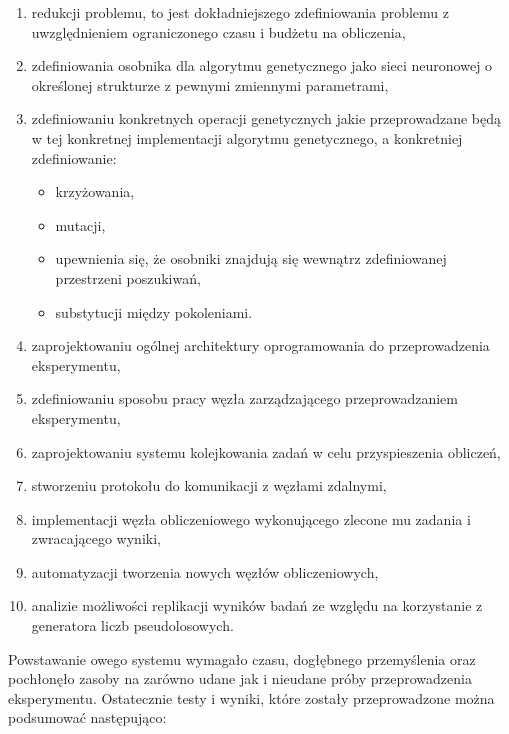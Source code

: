 \begin{enumerate}
  \item redukcji problemu, to jest dokładniejszego zdefiniowania problemu z uwzględnieniem ograniczonego czasu i budżetu na obliczenia,
  \item zdefiniowania osobnika dla algorytmu genetycznego jako sieci neuronowej o określonej strukturze z pewnymi zmiennymi parametrami,
  \item zdefiniowaniu konkretnych operacji genetycznych jakie przeprowadzane będą w tej konkretnej implementacji algorytmu genetycznego, a konkretniej zdefiniowanie:
  \begin{itemize}
    \item krzyżowania,
    \item mutacji,
    \item upewnienia się, że osobniki znajdują się wewnątrz zdefiniowanej przestrzeni poszukiwań,
    \item substytucji między pokoleniami.
  \end{itemize}
  \item zaprojektowaniu ogólnej architektury oprogramowania do przeprowadzenia eksperymentu,
  \item zdefiniowaniu sposobu pracy węzła zarządzającego przeprowadzaniem eksperymentu,
  \item zaprojektowaniu systemu kolejkowania zadań w celu przyspieszenia obliczeń,
  \item stworzeniu protokołu do komunikacji z węzłami zdalnymi,
  \item implementacji węzła obliczeniowego wykonującego zlecone mu zadania i zwracającego wyniki,
  \item automatyzacji tworzenia nowych węzłów obliczeniowych,
  \item analizie możliwości replikacji wyników badań ze względu na korzystanie z generatora liczb pseudolosowych.
\end{enumerate}

Powstawanie owego systemu wymagało czasu, dogłębnego przemyślenia oraz pochłonęło zasoby na zarówno udane jak i nieudane próby przeprowadzenia eksperymentu.
Ostatecznie testy i wyniki, które zostały przeprowadzone można podsumować następująco:

